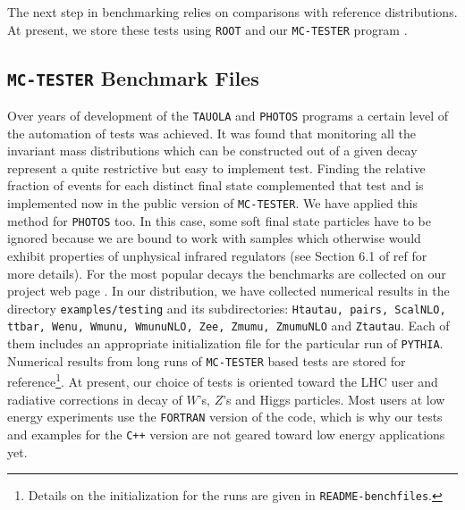 \documentclass[]{Photos_interface_design}
\begin{document}
The next step in benchmarking relies on comparisons with reference distributions. 
At present, we store these tests using {\tt ROOT} \cite{Antcheva:2009zz} and our {\tt MC-TESTER} program \cite{Davidson:2008ma}.



\subsection{{\tt MC-TESTER} Benchmark Files}



Over years of development of the {\tt TAUOLA} and {\tt PHOTOS} programs a certain level 
of the automation of tests was achieved. It was found that monitoring all the invariant mass distributions which can be constructed out of a given decay represent 
a quite restrictive but easy to implement test.
Finding the relative fraction of events for each distinct final state 
 complemented that test and is implemented now in the public version of {\tt MC-TESTER}. 
We have applied this method 
for {\tt PHOTOS} too. In this case, some soft final state particles have to be ignored because we are bound to  work with  samples which otherwise would
exhibit properties of unphysical infrared regulators (see Section 6.1 of 
ref \cite{Davidson:2008ma} for more details). For the most popular 
decays the benchmarks are collected on our project web page \cite{Photos_tests}.
In our distribution, we have collected numerical results in the directory
{\tt examples/testing} and its subdirectories:  
{\tt Htautau, pairs, ScalNLO, ttbar, Wenu, Wmunu, WmunuNLO, Zee, Zmumu, 
ZmumuNLO} and {\tt Ztautau}. Each of them includes
an appropriate initialization file for the particular run of {\tt PYTHIA}. Numerical results from long runs of {\tt MC-TESTER} based tests
are stored for reference\footnote{Details on the initialization for the 
runs are given in 
{\tt README-benchfiles}.}. At present, our choice of tests is oriented toward 
the LHC user and radiative corrections in decay of $W$'s, $Z$'s and Higgs particles.
Most users at low energy experiments use the {\tt FORTRAN} version 
of the code, which is why our tests and examples for the {\tt C++} version are not geared toward 
low energy applications yet.
\end{document}
